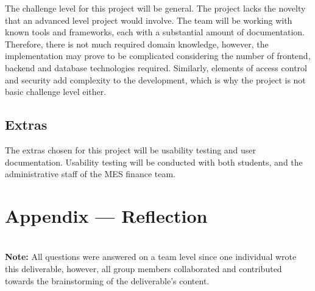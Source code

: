 \documentclass{article}
\begin{document}
The challenge level for this project will be general. The project lacks the novelty that an advanced level project would involve. The team will be working with known tools and frameworks, each with a substantial amount of documentation. Therefore, there is not much required domain knowledge, however, the implementation may prove to be complicated considering the number of frontend, backend and database technologies required. Similarly, elements of access control and security add complexity to the development, which is why the project is not basic challenge level either.

\subsection{Extras}

The extras chosen for this project will be usability testing and user documentation. Usability testing will be conducted with both students, and the administrative staff of the MES finance team.

\newpage{}

\section*{Appendix --- Reflection}


\\

\textbf{Note:} All questions were answered on a team level since one individual wrote this deliverable, however, all group members collaborated and contributed towards the brainstorming of the deliverable's content.
\end{document}
